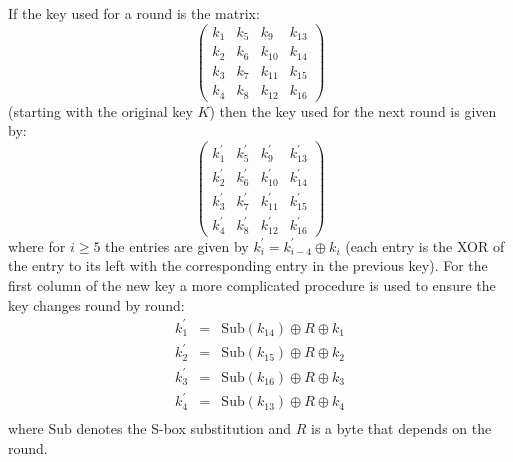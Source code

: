 If the key used for a round is the matrix:
\begin{displaymath}
  \left(\begin{array}{cccc}
    k_1 & k_5 & k_9    & k_{13} \\
    k_2 & k_6 & k_{10} & k_{14} \\
    k_3 & k_7 & k_{11} & k_{15} \\
    k_4 & k_8 & k_{12} & k_{16}
  \end{array}\right)
\end{displaymath}
(starting with the original key $K$) then the key used for the next round is given by:
\begin{displaymath}
  \left(\begin{array}{cccc}
    k_1^\prime & k_5^\prime & k_9^\prime    & k_{13}^\prime \\
    k_2^\prime & k_6^\prime & k_{10}^\prime & k_{14}^\prime \\
    k_3^\prime & k_7^\prime & k_{11}^\prime & k_{15}^\prime \\
    k_4^\prime & k_8^\prime & k_{12}^\prime & k_{16}^\prime
  \end{array}\right)
\end{displaymath}
where for $i\geq5$ the entries are given by
$k_i^\prime=k_{i-4}^\prime\oplus k_i$ (each entry is the XOR of the entry to its
left with the corresponding entry in the previous key).
For the first column of the new key a more complicated procedure is used to ensure
the key changes round by round:
\begin{eqnarray*}
  k_1^\prime &=& \mbox{Sub}(k_{14}) \oplus R \oplus k_1 \\
  k_2^\prime &=& \mbox{Sub}(k_{15}) \oplus R \oplus k_2 \\
  k_3^\prime &=& \mbox{Sub}(k_{16}) \oplus R \oplus k_3 \\
  k_4^\prime &=& \mbox{Sub}(k_{13}) \oplus R \oplus k_4 \\
\end{eqnarray*}
where $\mbox{Sub}$ denotes the S-box substitution and
$R$ is a byte that depends on the round.

